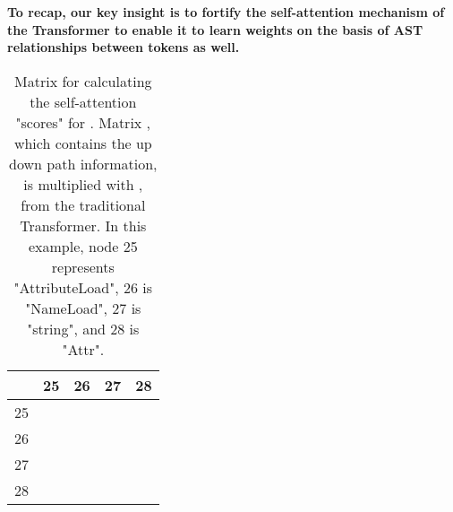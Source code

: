 \documentclass[nonacm, sigconf]{acmart}
\begin{document}
\bigskip

\textbf{To recap, our key insight is to fortify the self-attention mechanism of the Transformer to enable it to learn weights on the basis of AST relationships between tokens as well.}

\begin{table}
\begin{tabular}{|l|l|l|l|l|}  
\hline
& 25 & 26  & 27 & 28  \\ 
\hline
25
    &  &&& \\
26   
    &  
    &  && \\ 
27   
    &  
    &  
    &  & \\
28
    &  
    & 
    &   
    &   \\
\hline
\end{tabular}
\caption{Matrix for calculating the self-attention "scores" for \TreeRel. Matrix , which contains the up down path information, is multiplied with , from the traditional Transformer. In this example, node 25 represents "AttributeLoad", 26 is "NameLoad", 27 is "string", and 28 is "Attr".}
\label{tab:QKR}
\end{table}
\end{document}
